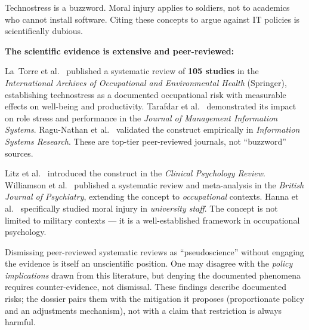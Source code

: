 \bigskip

\begin{questionbox}
Technostress is a buzzword. Moral injury applies to soldiers, not to academics who cannot install software. Citing these concepts to argue against IT policies is scientifically dubious.
\end{questionbox}

\begin{answerbox}[Answer to Q6.4]
\textbf{The scientific evidence is extensive and peer-reviewed:}

\begin{description}[nosep]
    \item[Technostress:] La~Torre et al.~\cite{latorre2019} published a systematic review of \textbf{105 studies} in the \emph{International Archives of Occupational and Environmental Health} (Springer), establishing technostress as a documented occupational risk with measurable effects on well-being and productivity. Tarafdar et al.~\cite{tarafdar2007} demonstrated its impact on role stress and performance in the \emph{Journal of Management Information Systems}. Ragu-Nathan et al.~\cite{ragunathan2008} validated the construct empirically in \emph{Information Systems Research}. These are top-tier peer-reviewed journals, not ``buzzword'' sources.

    \item[Moral injury:] Litz et al.~\cite{litz2009} introduced the construct in the \emph{Clinical Psychology Review}. Williamson et al.~\cite{williamson2018} published a systematic review and meta-analysis in the \emph{British Journal of Psychiatry}, extending the concept to \emph{occupational} contexts. Hanna et al.~\cite{hanna2023} specifically studied moral injury in \emph{university staff}. The concept is not limited to military contexts --- it is a well-established framework in occupational psychology.
\end{description}

\noindent Dismissing peer-reviewed systematic reviews as ``pseudoscience'' without engaging the evidence is itself an unscientific position. One may disagree with the \emph{policy implications} drawn from this literature, but denying the documented phenomena requires counter-evidence, not dismissal. These findings describe documented risks; the dossier pairs them with the mitigation it proposes (proportionate policy and an adjustments mechanism), not with a claim that restriction is always harmful.
\end{answerbox}


